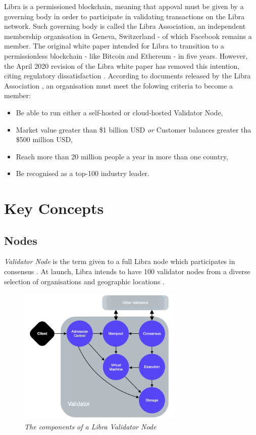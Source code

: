 \documentclass[12pt,openany,a4paper]{book}
\begin{document}
Libra is a permissioned blockchain, meaning that appoval must be given by a governing
body in order to participate in validating transactions on the Libra network. 
Such governing body is called the Libra Association, an independent 
membership organisation in Geneva, Switzerland - of which Facebook remains 
a member. The original white paper 
intended for Libra to transition to a permissionless blockchain 
- like Bitcoin and Ethereum - in five years. However, the April 2020 revision of the 
Libra white paper has removed this intention, citing regulatory dissatisfaction 
\cite{libra_whitepaper, verge_libra_shift}.
According to documents released by the Libra Association \cite{libra_association_member}, an organisation must
meet the folowing criteria to become a member:
\begin{itemize}
    \item Be able to run either a self-hosted or cloud-hosted Validator Node,
    \item Market value greater than \$1 billion USD \textit{or} Customer balances greater tha \$500 million USD,
    \item Reach more than 20 million people a year in more than one country,
    \item Be recognised as a top-100 industry leader.
\end{itemize}

\section{Key Concepts}
\label{__libra_blockchain:kc}
\subsection{Nodes}
\textit{Validator Node} is the term given to a full Libra node which participates 
in consensus \cite{libra_smr}. At launch, Libra intends to have 100 validator nodes from a diverse selection of 
organisations and geographic locations \cite{libra_path_forward, libra_whitepaper}.

\begin{figure}[h]
    \caption{\sl The components of a Libra Validator Node \cite{libra_validator_node}}
    \label{validator_node_img}
    \begin{center}
    \includegraphics[width=0.7\textwidth]{imgs/validator_node.png}
    \end{center}
\end{figure}
\end{document}
